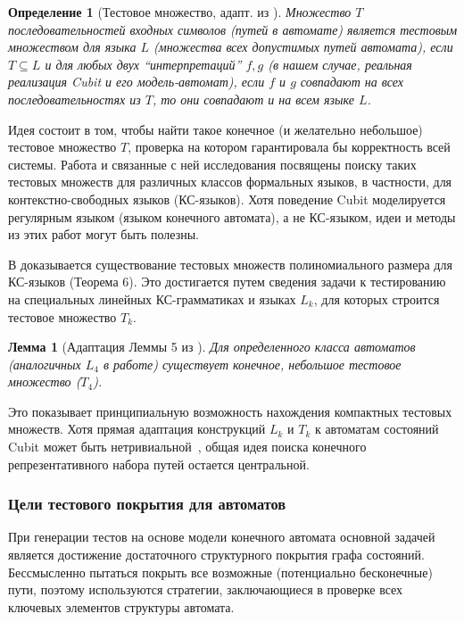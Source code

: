 \documentclass[14pt, russian]{scrartcl}
\newcommand{\enq}[1]{\enquote{#1}}
\newcounter{cDefinition}
\newcounter{cLemma}
\newtheorem{Definition}{Определение}[cDefinition]
\newtheorem{Lemma}{Лемма}[cLemma]
\begin{document}
\begin{Definition}[Тестовое множество, адапт. из \cite{Plandowski1993}]
Множество $T$ последовательностей входных символов (путей в автомате) является \emph{тестовым множеством} для языка $L$ (множества всех допустимых путей автомата), если $T \subseteq L$ и для любых двух \enq{интерпретаций} $f, g$ (в нашем случае, реальная реализация Cubit и его модель-автомат), если $f$ и $g$ совпадают на всех последовательностях из $T$, то они совпадают и на всем языке $L$.
\end{Definition}

Идея состоит в том, чтобы найти такое конечное (и желательно небольшое) тестовое множество $T$, проверка на котором гарантировала бы корректность всей системы. Работа \cite{Plandowski1993} и связанные с ней исследования \cite{Karhumaki1992, Karhumaki1993} посвящены поиску таких тестовых множеств для различных классов формальных языков, в частности, для контекстно-свободных языков (КС-языков). Хотя поведение Cubit моделируется регулярным языком (языком конечного автомата), а не КС-языком, идеи и методы из этих работ могут быть полезны.

В \cite{Plandowski1993} доказывается существование тестовых множеств полиномиального размера для КС-языков (Теорема 6). Это достигается путем сведения задачи к тестированию на специальных линейных КС-грамматиках и языках $L_k$, для которых строится тестовое множество $T_k$.

\begin{Lemma}[Адаптация Леммы 5 из \cite{Plandowski1993}]
Для определенного класса автоматов (аналогичных $L_4$ в работе) существует конечное, небольшое тестовое множество ($T_4$).
\end{Lemma}
Это показывает принципиальную возможность нахождения компактных тестовых множеств. Хотя прямая адаптация конструкций $L_k$ и $T_k$ к автоматам состояний Cubit может быть нетривиальной~\cite{Jaffar1990, KoscielskiPacholski1990}, общая идея поиска конечного репрезентативного набора путей остается центральной.

\subsubsection{Цели тестового покрытия для автоматов}

При генерации тестов на основе модели конечного автомата основной задачей является достижение достаточного структурного покрытия графа состояний. Бессмысленно пытаться покрыть все возможные (потенциально бесконечные) пути, поэтому используются стратегии, заключающиеся в проверке всех ключевых элементов структуры автомата.
\end{document}
